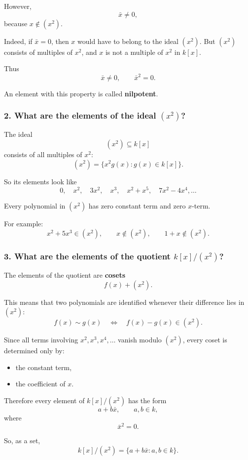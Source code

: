 \documentclass[12pt,a4paper]{article}
\theoremstyle{plain}
\theoremstyle{definition}      %
\begin{document}
	However,
	\[
	\bar x\neq 0,
	\]
	because \(x\notin (x^2)\).
	
	Indeed, if \(\bar x=0\), then \(x\) would have to belong to the ideal \((x^2)\).
	But \((x^2)\) consists of multiples of \(x^2\), and \(x\) is not a multiple of \(x^2\) in \(k[x]\).
	
	Thus
	\[
	\bar x\neq 0,
	\qquad
	\bar x^2=0.
	\]
	
	An element with this property is called \textbf{nilpotent}.
	
	\subsubsection*{2. What are the elements of the ideal \((x^2)\)?}
	
	The ideal
	\[
	(x^2)\subseteq k[x]
	\]
	consists of all multiples of \(x^2\):
	\[
	(x^2)=\{x^2g(x):g(x)\in k[x]\}.
	\]
	
	So its elements look like
	\[
	0,\quad x^2,\quad 3x^2,\quad x^3,\quad x^2+x^5,\quad 7x^2-4x^4,\dots
	\]
	
	Every polynomial in \((x^2)\) has zero constant term and zero \(x\)-term.
	
	For example:
	\[
	x^2+5x^3\in (x^2),
	\qquad
	x\notin (x^2),
	\qquad
	1+x\notin (x^2).
	\]
	
	\subsubsection*{3. What are the elements of the quotient \(k[x]/(x^2)\)?}
	
	The elements of the quotient are \textbf{cosets}
	\[
	f(x)+(x^2).
	\]
	
	This means that two polynomials are identified whenever their difference lies in \((x^2)\):
	\[
	f(x)\sim g(x)
	\quad\Longleftrightarrow\quad
	f(x)-g(x)\in (x^2).
	\]
	
	Since all terms involving \(x^2,x^3,x^4,\dots\) vanish modulo \((x^2)\), every coset is determined only by:
	\begin{itemize}
		\item the constant term,
		\item the coefficient of \(x\).
	\end{itemize}
	
	Therefore every element of \(k[x]/(x^2)\) has the form
	\[
	a+b\bar x,
	\qquad a,b\in k,
	\]
	where
	\[
	\bar x^2=0.
	\]
	
	So, as a set,
	\[
	k[x]/(x^2)=\{a+b\bar x:a,b\in k\}.
	\]
	
\end{document}
